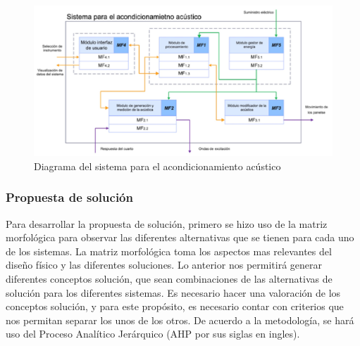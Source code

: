 \begin{figure}[!htb]
    \centering
    \includegraphics[width=1\textwidth]{imagenes/sistema para acondicionamiento.jpg}
    \caption{\footnotesize Diagrama del sistema para el acondicionamiento acústico}
    \label{fig:DiagramaSistema}
\end{figure}
\FloatBarrier

\subsubsection{Propuesta de solución}
Para desarrollar la propuesta de solución, primero se hizo uso de la matriz morfológica para observar las diferentes alternativas que se tienen para cada uno de los sistemas. La matriz morfológica toma los aspectos mas relevantes del diseño físico y las diferentes soluciones. Lo anterior nos permitirá generar diferentes conceptos solución, que sean combinaciones de las alternativas de solución para los diferentes sistemas.
Es necesario hacer una valoración de los conceptos solución, y para este propósito, es necesario contar con criterios que nos permitan separar los unos de los otros. De acuerdo a la metodología, se hará uso del Proceso Analítico Jerárquico (AHP por sus siglas en ingles).

